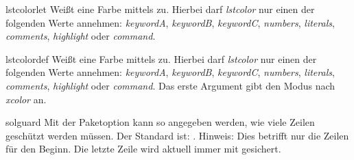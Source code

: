 \documentclass{sopra-base}
\begin{document}
\begin{command}{lstcolorlet}{}
    Weißt eine Farbe mittels  zu. Hierbei darf \emph{lstcolor} nur einen der folgenden Werte annehmen: \emph{keywordA}, \emph{keywordB}, \emph{keywordC}, \emph{numbers}, \emph{literals}, \emph{comments}, \emph{highlight} oder \emph{command}.
\end{command}

\begin{command}{lstcolordef}{}
    Weißt eine Farbe mittels  zu. Hierbei darf \emph{lstcolor} nur einen der folgenden Werte annehmen: \emph{keywordA}, \emph{keywordB}, \emph{keywordC}, \emph{numbers}, \emph{literals}, \emph{comments}, \emph{highlight} oder \emph{command}. Das erste Argument gibt den Modus nach \emph{xcolor} an.
\end{command}

\begin{command}{solguard}{}
    Mit der Paketoption  kann so angegeben werden, wie viele Zeilen geschützt werden müssen.
    Der Standard ist: \glqq{}{\makeatletter\@sol@guard@default}\grqq. Hinweis: Dies betrifft nur die Zeilen für den Beginn. Die letzte Zeile wird aktuell immer mit  gesichert.
\end{command}
\end{document}
